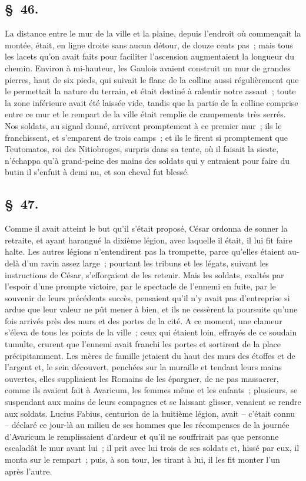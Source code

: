 \documentclass[french,twoside]{book} %
\begin{document}
\subsection[{§ 46.}]{ \textsc{§ 46.} }
\noindent La distance entre le mur de la ville et la plaine, depuis l’endroit où commençait la montée, était, en ligne droite sans aucun détour, de douze cents pas ; mais tous les lacets qu’on avait faits pour faciliter l’ascension augmentaient la longueur du chemin. Environ à mi-hauteur, les Gaulois avaient construit un mur de grandes pierres, haut de six pieds, qui suivait le flanc de la colline aussi régulièrement que le permettait la nature du terrain, et était destiné à ralentir notre assaut ; toute la zone inférieure avait été laissée vide, tandis que la partie de la colline comprise entre ce mur et le rempart de la ville était remplie de campements très serrés. Nos soldats, au signal donné, arrivent promptement à ce premier mur ; ils le franchissent, et s’emparent de trois camps ; et ils le firent si promptement que Teutomatos, roi des Nitiobroges, surpris dans sa tente, où il faisait la sieste, n’échappa qu’à grand-peine des mains des soldats qui y entraient pour faire du butin il s’enfuit à demi nu, et son cheval fut blessé.
\subsection[{§ 47.}]{ \textsc{§ 47.} }
\noindent Comme il avait atteint le but qu’il s’était proposé, César ordonna de sonner la retraite, et ayant harangué la dixième légion, avec laquelle il était, il lui fit faire halte. Les autres légions n’entendirent pas la trompette, parce qu’elles étaient au-delà d’un ravin assez large ; pourtant les tribuns et les légats, suivant les instructions de César, s’efforçaient de les retenir. Mais les soldats, exaltés par l’espoir d’une prompte victoire, par le spectacle de l’ennemi en fuite, par le souvenir de leurs précédents succès, pensaient qu’il n’y avait pas d’entreprise si ardue que leur valeur ne pût mener à bien, et ils ne cessèrent la poursuite qu’une fois arrivés près des murs et des portes de la cité. A ce moment, une clameur s’éleva de tous les points de la ville ; ceux qui étaient loin, effrayés de ce soudain tumulte, crurent que l’ennemi avait franchi les portes et sortirent de la place précipitamment. Les mères de famille jetaient du haut des murs des étoffes et de l’argent et, le sein découvert, penchées sur la muraille et tendant leurs mains ouvertes, elles suppliaient les Romains de les épargner, de ne pas massacrer, comme ils avaient fait à Avaricum, les femmes même et les enfants ; plusieurs, se suspendant aux mains de leurs compagnes et se laissant glisser, venaient se rendre aux soldats. Lucius Fabius, centurion de la huitième légion, avait – c’était connu – déclaré ce jour-là au milieu de ses hommes que les récompenses de la journée d’Avaricum le remplissaient d’ardeur et qu’il ne souffrirait pas que personne escaladât le mur avant lui ; il prit avec lui trois de ses soldats et, hissé par eux, il monta sur le rempart ; puis, à son tour, les tirant à lui, il les fit monter l’un après l’autre.
\end{document}
